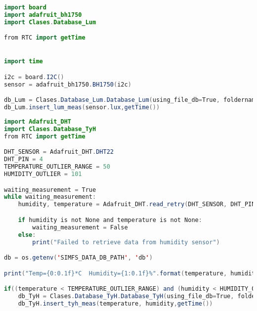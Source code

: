 \begin{lstlisting}[language=Java]
import board
import adafruit_bh1750
import Clases.Database_Lum

from RTC import getTime


import time

i2c = board.I2C()
sensor = adafruit_bh1750.BH1750(i2c)

db_Lum = Clases.Database_Lum.Database_Lum(using_file_db=True, foldername='db')
db_Lum.insert_lum_meas(sensor.lux,getTime())
\end{lstlisting}

\begin{lstlisting}[language=Java]
import Adafruit_DHT
import Clases.Database_TyH
from RTC import getTime

DHT_SENSOR = Adafruit_DHT.DHT22
DHT_PIN = 4
TEMPERATURE_OUTLIER_RANGE = 50
HUMIDITY_OUTLIER = 101

waiting_measurement = True
while waiting_measurement:
    humidity, temperature = Adafruit_DHT.read_retry(DHT_SENSOR, DHT_PIN)

    if humidity is not None and temperature is not None:
        waiting_measurement = False
    else:
        print("Failed to retrieve data from humidity sensor")

db = os.getenv('SIMFS_DATA_DB_PATH', 'db')

print("Temp={0:0.1f}*C  Humidity={1:0.1f}%".format(temperature, humidity))

if((temperature < TEMPERATURE_OUTLIER_RANGE) and (humidity < HUMIDITY_OUTLIER)):
    db_TyH = Clases.Database_TyH.Database_TyH(using_file_db=True, foldername='db')
    db_TyH.insert_tyh_meas(temperature, humidity,getTime())
\end{lstlisting}


